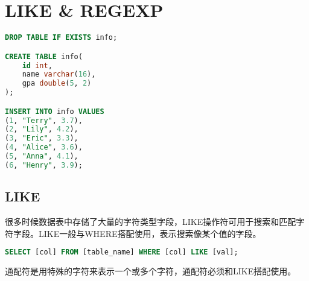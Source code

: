 \documentclass[12pt, openany, oneside]{book}
\begin{document}
\newpage

\chapter{LIKE \& REGEXP}

\vspace{0.5cm}


\begin{lstlisting}[language=SQL]
DROP TABLE IF EXISTS info;

CREATE TABLE info(
    id int,
    name varchar(16),
    gpa double(5, 2)
);

INSERT INTO info VALUES
(1, "Terry", 3.7),
(2, "Lily", 4.2),
(3, "Eric", 3.3),
(4, "Alice", 3.6),
(5, "Anna", 4.1),
(6, "Henry", 3.9);
\end{lstlisting}

\vspace{0.5cm}

\section{LIKE}

很多时候数据表中存储了大量的字符类型字段，LIKE操作符可用于搜索和匹配字符字段。LIKE一般与WHERE搭配使用，表示搜索像某个值的字段。

\vspace{-0.5cm}

\begin{lstlisting}[language=SQL]
SELECT [col] FROM [table_name] WHERE [col] LIKE [val];
\end{lstlisting}

通配符是用特殊的字符来表示一个或多个字符，通配符必须和LIKE搭配使用。

\begin{table}[H]
	\centering
	\caption{通配符}
\end{table}
\end{document}
